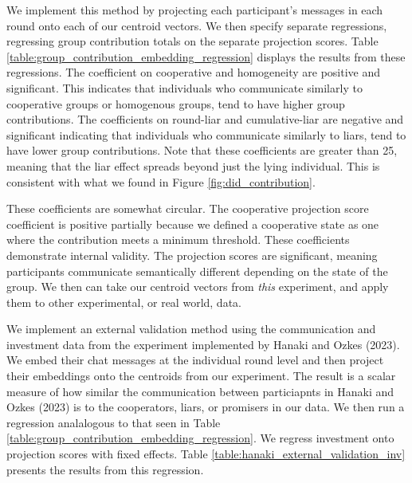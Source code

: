 \documentclass[12pt,letterpaper,english]{article}
\begin{document}
We implement this method by projecting each participant's messages in each round onto each of our centroid vectors. We then specify separate regressions,
regressing group contribution totals on the separate projection scores. Table \ref{table:group_contribution_embedding_regression}
displays the results from these regressions. The coefficient on cooperative and homogeneity are positive and significant. This indicates
that individuals who communicate similarly to cooperative groups or homogenous groups, tend to have higher group contributions. The coefficients
on round-liar and cumulative-liar are negative and significant indicating that individuals who communicate similarly to liars, tend to have lower 
group contributions. Note that these coefficients are greater than 25, meaning that the liar effect spreads beyond just the lying individual. This 
is consistent with what we found in Figure \ref{fig:did_contribution}.

These coefficients are somewhat circular. The cooperative projection score coefficient is positive partially because we defined a cooperative state
as one where the contribution meets a minimum threshold. These coefficients demonstrate internal validity. The projection scores are significant, meaning
participants communicate semantically different depending on the state of the group. We then can take our centroid vectors from \textit{this} experiment,
and apply them to other experimental, or real world, data. 

\begin{table}

\caption{Regression results from regressing group contribution on the separate projection scores. Standard errors clustered at the group level.}
\label{table:group_contribution_embedding_regression}
\end{table}


We implement an external validation method using the communication and investment data from 
the experiment implemented by Hanaki and Ozkes (2023). We embed their chat messages at the individual
round level and then project their embeddings onto the centroids from our experiment. The result is a
scalar measure of how similar the communication between particiapnts in Hanaki and Ozkes (2023) is to 
the cooperators, liars, or promisers in our data. We then run a regression analalogous to that seen in
Table \ref{table:group_contribution_embedding_regression}. We regress investment onto projection scores
with fixed effects. Table \ref{table:hanaki_external_validation_inv} presents the results from this regression.
\end{document}
